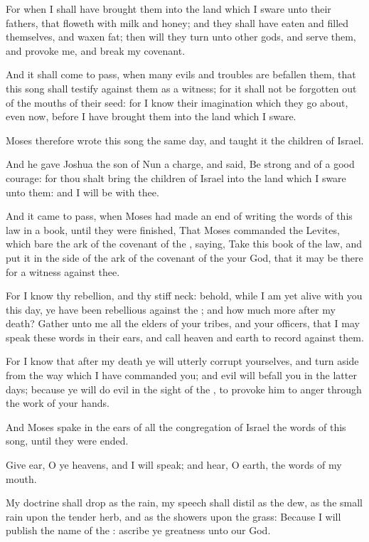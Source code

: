 \Verse For when I shall have brought them into the land which I sware unto their fathers, that floweth with milk and honey; and they shall have eaten and filled themselves, and waxen fat; then will they turn unto other gods, and serve them, and provoke me, and break my covenant.

\Verse And it shall come to pass, when many evils and troubles are befallen them, that this song shall testify against them as a witness; for it shall not be forgotten out of the mouths of their seed: for I know their imagination which they go about, even now, before I have brought them into the land which I sware.

\Verse Moses therefore wrote this song the same day, and taught it the children of Israel.

\Verse And he gave Joshua the son of Nun a charge, and said, Be strong and of a good courage: for thou shalt bring the children of Israel into the land which I sware unto them: and I will be with thee.

\Verse And it came to pass, when Moses had made an end of writing the words of this law in a book, until they were finished, \Verse That Moses commanded the Levites, which bare the ark of the covenant of the \LORD, saying, \Verse Take this book of the law, and put it in the side of the ark of the covenant of the \LORD your God, that it may be there for a witness against thee.

\Verse For I know thy rebellion, and thy stiff neck: behold, while I am yet alive with you this day, ye have been rebellious against the \LORD; and how much more after my death?  \Verse Gather unto me all the elders of your tribes, and your officers, that I may speak these words in their ears, and call heaven and earth to record against them.

\Verse For I know that after my death ye will utterly corrupt yourselves, and turn aside from the way which I have commanded you; and evil will befall you in the latter days; because ye will do evil in the sight of the \LORD, to provoke him to anger through the work of your hands.

\Verse And Moses spake in the ears of all the congregation of Israel the words of this song, until they were ended.


\Chapter
\Verse Give ear, O ye heavens, and I will speak; and hear, O earth, the words of my mouth.

\Verse My doctrine shall drop as the rain, my speech shall distil as the dew, as the small rain upon the tender herb, and as the showers upon the grass: \Verse Because I will publish the name of the \LORD: ascribe ye greatness unto our God.

